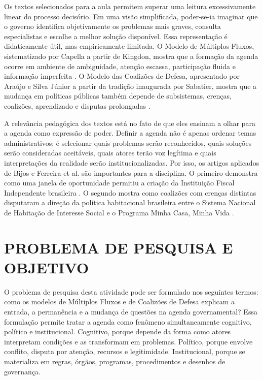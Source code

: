 \documentclass[12pt,a4paper]{article}
\begin{document}
Os textos selecionados para a aula permitem superar uma leitura excessivamente linear do processo decisório. Em uma visão simplificada, poder-se-ia imaginar que o governo identifica objetivamente os problemas mais graves, consulta especialistas e escolhe a melhor solução disponível. Essa representação é didaticamente útil, mas empiricamente limitada. O Modelo de Múltiplos Fluxos, sistematizado por Capella a partir de Kingdon, mostra que a formação da agenda ocorre em ambiente de ambiguidade, atenção escassa, participação fluida e informação imperfeita \autocites{kingdon2003agendas}[][]{capella2022multiplos}. O Modelo das Coalizões de Defesa, apresentado por Araújo e Silva Júnior a partir da tradição inaugurada por Sabatier, mostra que a mudança em políticas públicas também depende de subsistemas, crenças, coalizões, aprendizado e disputas prolongadas \autocites{sabatier1999theories}[][]{araujoSilva2022coalizoes}.

A relevância pedagógica dos textos está no fato de que eles ensinam a olhar para a agenda como expressão de poder. Definir a agenda não é apenas ordenar temas administrativos; é selecionar quais problemas serão reconhecidos, quais soluções serão consideradas aceitáveis, quais atores terão voz legítima e quais interpretações da realidade serão institucionalizadas. Por isso, os artigos aplicados de Bijos e Ferreira et al. são importantes para a disciplina. O primeiro demonstra como uma janela de oportunidade permitiu a criação da Instituição Fiscal Independente brasileira \autocite{bijos2024ifi}. O segundo mostra como coalizões com crenças distintas disputaram a direção da política habitacional brasileira entre o Sistema Nacional de Habitação de Interesse Social e o Programa Minha Casa, Minha Vida \autocite{ferreira2019habitacional}.

\section{PROBLEMA DE PESQUISA E OBJETIVO}
\label{sec:org5db3cf3}
O problema de pesquisa desta atividade pode ser formulado nos seguintes termos: como os modelos de Múltiplos Fluxos e de Coalizões de Defesa explicam a entrada, a permanência e a mudança de questões na agenda governamental? Essa formulação permite tratar a agenda como fenômeno simultaneamente cognitivo, político e institucional. Cognitivo, porque depende da forma como atores interpretam condições e as transformam em problemas. Político, porque envolve conflito, disputa por atenção, recursos e legitimidade. Institucional, porque se materializa em regras, órgãos, programas, procedimentos e desenhos de governança.
\end{document}
